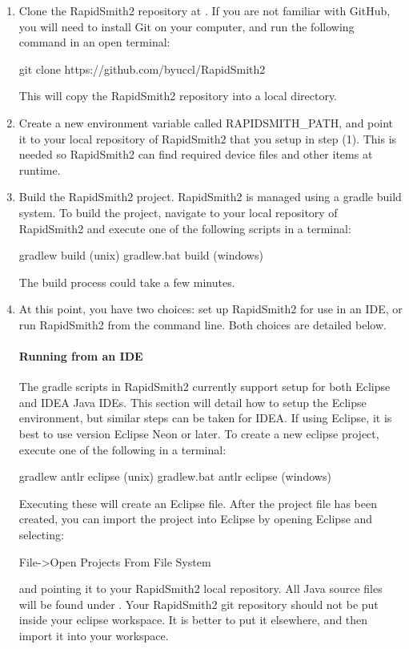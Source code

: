 \begin{enumerate}
  \item Clone the RapidSmith2 repository at
  {}. If you are not
  familiar with GitHub, you will need to install Git on your computer, and run the
  following command in an open terminal: 
\vspace{-0.07in}
\begin{code}
git clone https://github.com/byuccl/RapidSmith2
\end{code} 
  \noindent This will copy the RapidSmith2 repository into a local directory.
  \item Create a new environment variable called RAPIDSMITH\_PATH, and point it
  to your local repository of RapidSmith2 that you setup in step (1). This is needed so
  RapidSmith2 can find required device files and other items at runtime.
  \item Build the  RapidSmith2 project. RapidSmith2 is managed using a gradle build system.
  To build the project, navigate to your local repository of RapidSmith2 and execute one
  of the following scripts in a terminal:
  \begin{code}
	gradlew build (unix)
	gradlew.bat build (windows)
  \end{code}
  The build process could take a few minutes.
  \item At this point, you have two choices: set up RapidSmith2 for use in an IDE, or
  run RapidSmith2 from the command line. Both choices are detailed below.
  \paragraph{Running from an IDE} The gradle scripts in RapidSmith2 currently support
  setup for both Eclipse and IDEA Java IDEs. This section will detail how to
  setup the Eclipse environment, but similar steps can be taken for IDEA. If
  using Eclipse, it is best to use version Eclipse Neon or later. To create a
  new eclipse project, execute one of the following in a terminal:
  \begin{code}
	gradlew antlr eclipse (unix)       
	gradlew.bat antlr eclipse (windows)
  \end{code}
  Executing these will create an Eclipse  file. After the project
  file has been created, you can import the project into Eclipse by opening
  Eclipse and selecting:
  \begin{code}
	File->Open Projects From File System 
  \end{code}
  and pointing it to your RapidSmith2 local repository. All Java source files
  will be found under .  Your RapidSmith2 git repository
  should not be put inside your eclipse workspace. It is better to put it
  elsewhere, and then import it into your workspace.

\end{enumerate}
